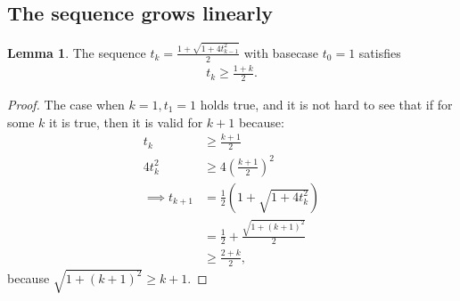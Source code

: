 \documentclass[]{article}
\theoremstyle{definition}
\newtheorem{lemma}{Lemma}[subsection]  %
\begin{document}
    \subsection{The sequence grows linearly}
        \begin{lemma}\label{lemma:fista_seq}
            The sequence $t_k = \frac{1 + \sqrt{1 + 4t_{k -1}^2}}{2}$ with basecase $t_0 = 1$ satisfies 
            \begin{align*}
                t_k \ge \frac{1 + k}{2}. 
            \end{align*}
        \end{lemma}
        \begin{proof}
            The case when $k = 1, t_1 = 1$ holds true, and it is not hard to see that if for some $k$ it is true, then it is valid for $k + 1$ because: 
            \begin{align*}
                t_k 
                &\ge \frac{k + 1}{2}
                \\
                4t_k^2 
                &\ge 4\left(
                    \frac{k + 1}{2}
                \right)^2
                \\
                \implies 
                t_{k + 1} &= \frac{1}{2}\left(
                    1 + \sqrt{1 + 4t_k^2}
                \right)
                \\
                &= 
                \frac{1}{2} + \frac{\sqrt{1 + (k + 1)^2}}{2}
                \\
                & \ge \frac{2 + k}{2}, 
            \end{align*}
            because $\sqrt{1 + (k + 1)^2} \ge k + 1$. 
        \end{proof}
        
\end{document}
